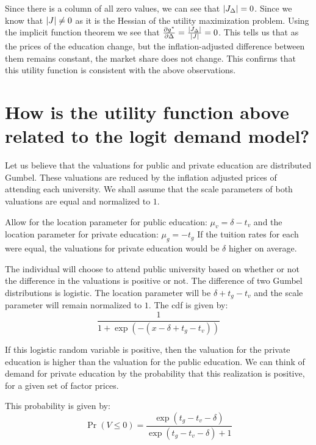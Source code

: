 \documentclass[12pt]{paper}
\begin{document}
Since there is a column of all zero values, we can see that
$\left \lvert J_{\Delta} \right \rvert = 0$. Since we know that $\left \lvert J \right \rvert \neq 0$ as it is the
Hessian of the utility maximization problem. Using the implicit
function theorem we see that $\frac{ \partial g^{*}}{ \partial \Delta} =
\frac{\left \lvert J_{\Delta} \right \rvert}{\left \lvert J \right \rvert} = 0$. This tells us that as the prices of
the education change, but the inflation-adjusted difference between
them remains constant, the market share does not change. This confirms
that this utility function is consistent with the above observations.

\section{How is the utility function above related to the logit demand
  model?}

Let us believe that the valuations for public and private education
are distributed Gumbel. These valuations are reduced by the inflation
adjusted prices of attending each university. We shall assume that the
scale parameters of both valuations are equal and normalized to $1$.

Allow for the location parameter for public education: $\mu_v = \delta - t_v$
and the location parameter for private education: $\mu_g = - t_g$ If the
tuition rates for each were equal, the valuations for private
education would be $\delta$ higher on average. 

The individual will choose to attend public university based on
whether or not the difference in the valuations is positive or
not. The difference of two Gumbel distributions is logistic. The
location parameter will be $\delta + t_g - t_v$ and the scale parameter
will remain normalized to $1$. The cdf is given by:
\begin{equation*}
  \frac{1}{1 + \exp \left( - ( x- \delta + t_g - t_v) \right)}
\end{equation*}

If this logistic random variable is positive, then the valuation for
the private education is higher than the valuation for the public
education. We can think of demand for private education by the
probability that this realization is positive, for a given set of
factor prices.

This probability is given by:
\begin{equation*}
  \Pr( V \leq 0) = \frac{\exp \left( t_g - t_v - \delta \right)}{\exp \left( t_g - t_v - \delta \right) + 1}
\end{equation*}
\end{document}
